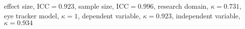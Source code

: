 effect size, $\textrm{ICC} = 0.923$, sample size, $\textrm{ICC} = 0.996$, research domain, $\kappa = 0.731$, eye tracker model, $\kappa = 1$, dependent variable, $\kappa = 0.923$, independent variable, $\kappa = 0.934$